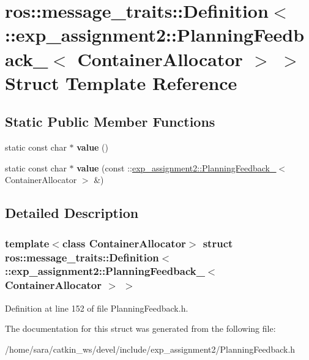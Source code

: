 \hypertarget{structros_1_1message__traits_1_1Definition_3_01_1_1exp__assignment2_1_1PlanningFeedback___3_01ContainerAllocator_01_4_01_4}{}\section{ros\+:\+:message\+\_\+traits\+:\+:Definition$<$ \+:\+:exp\+\_\+assignment2\+:\+:Planning\+Feedback\+\_\+$<$ Container\+Allocator $>$ $>$ Struct Template Reference}
\label{structros_1_1message__traits_1_1Definition_3_01_1_1exp__assignment2_1_1PlanningFeedback___3_01ContainerAllocator_01_4_01_4}
\subsection*{Static Public Member Functions}
\begin{DoxyCompactItemize}
\item 
\mbox{\label{structros_1_1message__traits_1_1Definition_3_01_1_1exp__assignment2_1_1PlanningFeedback___3_01ContainerAllocator_01_4_01_4_aba3e793575d7ae69ffa5c09e2b89f494}} 
static const char $\ast$ {\bfseries value} ()
\item 
\mbox{\label{structros_1_1message__traits_1_1Definition_3_01_1_1exp__assignment2_1_1PlanningFeedback___3_01ContainerAllocator_01_4_01_4_a71b48bd722d013901b27697aad77c174}} 
static const char $\ast$ {\bfseries value} (const \+::\hyperlink{structexp__assignment2_1_1PlanningFeedback__}{exp\+\_\+assignment2\+::\+Planning\+Feedback\+\_\+}$<$ Container\+Allocator $>$ \&)
\end{DoxyCompactItemize}


\subsection{Detailed Description}
\subsubsection*{template$<$class Container\+Allocator$>$\newline
struct ros\+::message\+\_\+traits\+::\+Definition$<$ \+::exp\+\_\+assignment2\+::\+Planning\+Feedback\+\_\+$<$ Container\+Allocator $>$ $>$}



Definition at line 152 of file Planning\+Feedback.\+h.



The documentation for this struct was generated from the following file\+:\begin{DoxyCompactItemize}
\item 
/home/sara/catkin\+\_\+ws/devel/include/exp\+\_\+assignment2/Planning\+Feedback.\+h\end{DoxyCompactItemize}
